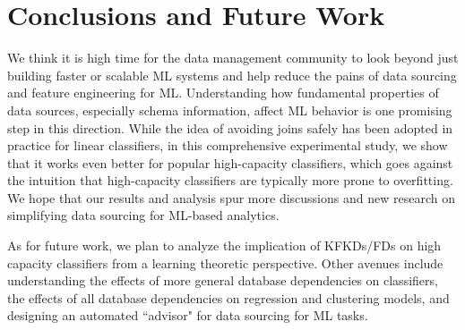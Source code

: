 \documentclass{vldb}
\begin{document}




\section{Conclusions and Future Work}
We think it is high time for the data management community to look beyond just building faster 
or scalable ML systems and help reduce the pains of data sourcing and feature engineering for ML. 
Understanding how fundamental properties of data sources, especially schema information, affect 
ML behavior is one promising step in this direction. 
While the idea of avoiding joins safely has been adopted  in practice for 
linear classifiers, in this comprehensive experimental study, we show that it works even better for 
popular high-capacity classifiers, which goes against the intuition that high-capacity classifiers 
are typically more prone to overfitting. We hope that our results and analysis spur more discussions 
and new research on simplifying data sourcing for ML-based analytics.

As for future work, we plan to analyze the implication of KFKDs/FDs on high capacity classifiers 
from a learning theoretic perspective. Other avenues include understanding the effects of more 
general database dependencies on classifiers, the effects of all database dependencies on 
regression and clustering models, and designing an automated ``advisor" for data sourcing for ML tasks.

\pagebreak



\end{document}
